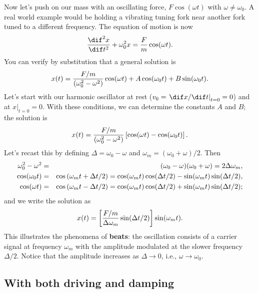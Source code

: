 Now let's push on our mass with an oscillating force, $F\cos(\omega t)$ with $\omega\neq\omega_{0}$. A real world example would be holding a vibrating tuning fork near another fork tuned to a different frequency.  The equation of motion is now
\begin{equation}\label{e.SHO-driven}
	\DDtt{x} + \omega_{0}^{2}x = \frac{F}{m}\cos(\wt).
\end{equation}
You can verify by substitution that a general solution is
\[
	x(t) = \frac{F/m}{(\omega_{0}^{2}-\omega^{2})}\cos(\omega t) + A\cos(\omega_{0} t)+B\sin(\omega_{0} t).
\]
Let's start with our harmonic oscillator at rest ($v_{0} = \left.\dif x/\dif t\right|_{t=0} = 0$) and at $\left. x\right|_{t=0} = 0$.  With these conditions, we can determine the constants $A$ and $B$; the solution is
\[
	x(t) = \frac{F/m}{(\omega_{0}^{2}-\omega^{2})}\left[\cos(\omega t)-\cos(\omega_{0} t)\right].
\]
Let's recast this by defining $\Delta = \omega_{0} - \omega$ and $\omega_{m} = (\omega_{0}+\omega)/2$.  Then
\begin{eqnarray*}
  \omega_{0}^{2}-\omega^{2} &=& (\omega_{0}-\omega)(\omega_{0}+\omega) = 2\Delta\omega_{m},\\
  \cos(\omega_{0} t) &=& \cos\left(\omega_{m} t+\Delta t/2\right) = \cos(\omega_{m} t)\cos(\Delta t/2) - \sin(\omega_{m} t)\sin(\Delta t/2),\\
  \cos(\omega t) &=& \cos\left(\omega_{m} t-\Delta t/2\right) = \cos(\omega_{m} t)\cos(\Delta t/2) + \sin(\omega_{m} t)\sin(\Delta t/2);
\end{eqnarray*}
and we write the solution as
\begin{equation}\label{e.beats}
	x(t) = \left[\frac{F/m}{\Delta\omega_{m}}\sin(\Delta t/2)\right]\sin(\omega_{m} t).
\end{equation}
This illustrates the phenomena of \textbf{beats}: the oscillation consists of a carrier signal at frequency $\omega_{m}$ with the amplitude modulated at the slower frequency $\Delta /2$.  Notice that the amplitude increases as $\Delta \to0$, i.e., $\omega\to\omega_{0}$.

\subsection{With both driving and damping}

